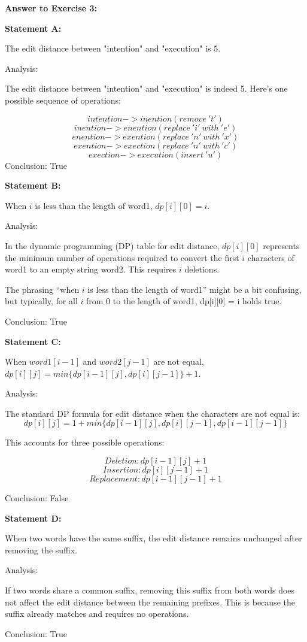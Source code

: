 \documentclass{article}
\begin{document}
\textbf{Answer to Exercise 3:}\par
\textbf{Statement A:}\par
The edit distance between "intention" and "execution" is 5.\par
Analysis: \par
The edit distance between "intention" and "execution" is indeed 5. Here's one possible sequence of operations:\par
$$intention -> inention (remove \ 't')$$
$$inention -> enention (replace \ 'i' \ with \ 'e')$$
$$enention -> exention (replace \ 'n' \ with \ 'x')$$
$$exention -> exection (replace \ 'n' \ with \ 'c')$$
$$exection -> execution (insert \ 'u')$$
Conclusion: True\par
\textbf{Statement B:}\par
When $i$ is less than the length of word1, $dp[i][0] = i$.\par
Analysis: \par
In the dynamic programming (DP) table for edit distance, $dp[i][0]$ represents the minimum number of operations required to convert the first $i$ characters of word1 to an empty string word2. This requires $i$ deletions.\par
The phrasing “when $i$ is less than the length of word1” might be a bit confusing, but typically, for all $i$ from 0 to the length of word1, dp[i][0] = i holds true.\par
Conclusion: True\par
\textbf{Statement C:}\par
When $word1[i - 1]$ and $word2[j - 1]$ are not equal, $dp[i][j] = min \{ dp[i - 1][j], dp[i][j - 1] \} + 1$.\par
Analysis: \par
The standard DP formula for edit distance when the characters are not equal is:
$$dp[i][j] = 1 + min \{ dp[i-1][j], dp[i][j-1], dp[i-1][j-1] \}$$\par
This accounts for three possible operations:\par
$$Deletion: dp[i-1][j] + 1$$
$$Insertion: dp[i][j-1] + 1$$
$$Replacement: dp[i-1][j-1] + 1$$\par
Conclusion: False\par
\textbf{Statement D:}\par
When two words have the same suffix, the edit distance remains unchanged after removing the suffix.\par
Analysis: \par
If two words share a common suffix, removing this suffix from both words does not affect the edit distance between the remaining prefixes. This is because the suffix already matches and requires no operations.\par
Conclusion: True\par
\end{document}
